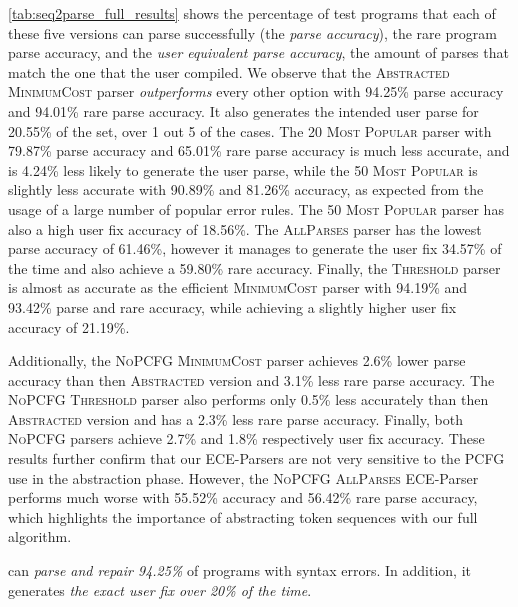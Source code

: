 \autoref{tab:seq2parse_full_results} shows the percentage of test programs that
each of these five versions can parse successfully (\ie the \emph{parse
accuracy}), the rare program parse accuracy, and the \emph{user equivalent parse
accuracy}, \ie the amount of parses that match the one that the user compiled.
We observe that the \textsc{Abstracted} \textsc{MinimumCost} parser
\emph{outperforms} every other option with 94.25\% parse accuracy and 94.01\%
rare parse accuracy. It also generates the intended user parse for 20.55\% of
the set, \ie over 1 out 5 of the cases. The \textsc{20 Most Popular} parser with
79.87\% parse accuracy and 65.01\% rare parse accuracy is much less accurate,
and is 4.24\% less likely to generate the user parse, while the \textsc{50 Most
Popular} is slightly less accurate with 90.89\% and 81.26\% accuracy, as
expected from the usage of a large number of popular error rules. The \textsc{50
Most Popular} parser has also a high user fix accuracy of 18.56\%. The
\textsc{AllParses} parser has the lowest parse accuracy of 61.46\%, however it
manages to generate the user fix 34.57\% of the time and also achieve a 59.80\%
rare accuracy. Finally, the \textsc{Threshold} parser is almost as accurate as
the efficient \textsc{MinimumCost} parser with 94.19\% and 93.42\% parse and
rare accuracy, while achieving a slightly higher user fix accuracy of 21.19\%.

Additionally, the \textsc{NoPCFG} \textsc{MinimumCost} parser achieves 2.6\%
lower parse accuracy than then \textsc{Abstracted} version and 3.1\% less rare
parse accuracy. The \textsc{NoPCFG} \textsc{Threshold} parser also performs only
0.5\% less accurately than then \textsc{Abstracted} version and has a 2.3\% less
rare parse accuracy. Finally, both \textsc{NoPCFG} parsers achieve 2.7\% and
1.8\% respectively user fix accuracy. These results further confirm that our
ECE-Parsers are not very sensitive to the PCFG use in the abstraction phase.
However, the \textsc{NoPCFG} \textsc{AllParses} ECE-Parser performs much worse
with 55.52\% accuracy and 56.42\% rare parse accuracy, which highlights the
importance of abstracting token sequences with our full algorithm.

\begin{framed}
  \noindent \toolname can \emph{parse and repair 94.25\%} of programs with
  syntax errors. In addition, it generates \emph{the exact user fix over 20\% of
  the time}.
\end{framed}

